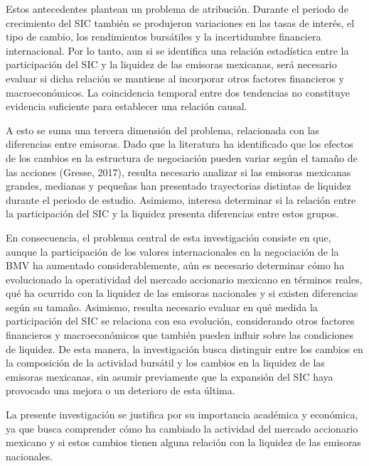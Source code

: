 Estos antecedentes plantean un problema de atribución. Durante el periodo de crecimiento del SIC también se produjeron variaciones en las tasas de interés, el tipo de cambio, los rendimientos bursátiles y la incertidumbre financiera internacional. Por lo tanto, aun si se identifica una relación estadística entre la participación del SIC y la liquidez de las emisoras mexicanas, será necesario evaluar si dicha relación se mantiene al incorporar otros factores financieros y macroeconómicos. La coincidencia temporal entre dos tendencias no constituye evidencia suficiente para establecer una relación causal.

A esto se suma una tercera dimensión del problema, relacionada con las diferencias entre emisoras. Dado que la literatura ha identificado que los efectos de los cambios en la estructura de negociación pueden variar según el tamaño de las acciones (Gresse, 2017), resulta necesario analizar si las emisoras mexicanas grandes, medianas y pequeñas han presentado trayectorias distintas de liquidez durante el periodo de estudio. Asimismo, interesa determinar si la relación entre la participación del SIC y la liquidez presenta diferencias entre estos grupos.

En consecuencia, el problema central de esta investigación consiste en que, aunque la participación de los valores internacionales en la negociación de la BMV ha aumentado considerablemente, aún es necesario determinar cómo ha evolucionado la operatividad del mercado accionario mexicano en términos reales, qué ha ocurrido con la liquidez de las emisoras nacionales y si existen diferencias según su tamaño. Asimismo, resulta necesario evaluar en qué medida la participación del SIC se relaciona con esa evolución, considerando otros factores financieros y macroeconómicos que también pueden influir sobre las condiciones de liquidez. De esta manera, la investigación busca distinguir entre los cambios en la composición de la actividad bursátil y los cambios en la liquidez de las emisoras mexicanas, sin asumir previamente que la expansión del SIC haya provocado una mejora o un deterioro de esta última.


La presente investigación se justifica por su importancia académica y económica, ya que busca comprender cómo ha cambiado la actividad del mercado accionario mexicano y si estos cambios tienen alguna relación con la liquidez de las emisoras nacionales.

